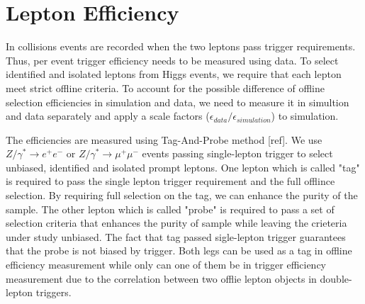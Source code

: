 

\section{Lepton Efficiency}

In collisions events are recorded when the two leptons pass trigger requirements. 
Thus, per event trigger efficiency needs to be measured using data. 
To select identified and isolated leptons from Higgs events, we require 
that each lepton meet strict offline criteria. To account for the possible difference
of offline selection efficiencies in simulation and data, we need to measure it 
in simultion and data separately and apply a scale factors
($\epsilon_{data}/\epsilon_{simulation}$) to simulation. 

The efficiencies are measured using Tag-And-Probe method [ref]. We use 
$Z/\gamma^* \rightarrow e^+e^-$ or $Z/\gamma^* \rightarrow \mu^+\mu^-$ events 
passing single-lepton trigger to select unbiased, identified and isolated prompt leptons.  
One lepton which is called "tag" is required to pass the single lepton trigger 
requirement and the full offlince selection. By requiring full selection on the tag, 
we can enhance the purity of the sample. The other lepton which is called 
"probe" is required to pass a set of selection criteria that enhances the purity 
of sample while leaving the crieteria under study unbiased. The fact that tag 
passed sigle-lepton trigger guarantees that the probe is not biased by trigger. 
Both legs can be used as a tag in offline efficiency measurement while only 
can one of them be in trigger efficiency measurement due to the correlation 
between two offlie lepton objects in double-lepton triggers. 

